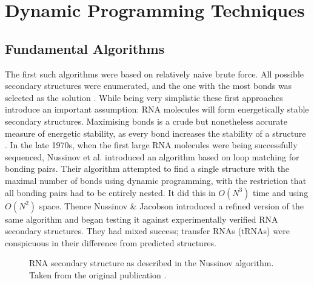 \documentclass{cshonours}
\begin{document}
\section{Dynamic Programming Techniques}
\subsection{Fundamental Algorithms}
The first such algorithms were based on relatively naive brute force. All possible secondary structures were enumerated, and the one with
the most bonds was selected as the solution \cite{nussinov1978algorithms}. While being very simplistic
these first approaches introduce an important assumption: RNA molecules will
form energetically stable secondary structures. Maximising bonds is a crude but
nonetheless accurate measure of energetic stability, as every bond increases the
stability of a structure \cite{nussinov1978algorithms}. In the late 1970s, when the first large RNA molecules
were being successfully sequenced, Nussinov et al. \cite{nussinov1978algorithms} introduced an algorithm
based on loop matching for bonding pairs. Their algorithm attempted to find a
single structure with the maximal number of bonds using dynamic programming,
with the restriction that all bonding pairs had to be entirely nested. It did this in $O(N^3)$ time and using $O(N^2)$ space. Thence Nussinov \& Jacobson \cite{nussinov1980fast} introduced
a refined version of the same algorithm and began testing it against experimentally verified RNA secondary structures. They had mixed success; transfer RNAs
(tRNAs) were conspicuous in their difference from predicted structures.

\begin{figure}
\begin{center}
\end{center}
\caption{RNA secondary structure as described in the Nussinov algorithm.
Taken from the original publication \cite{nussinov1980fast}.}
\label{nuss_rna}
\end{figure}
\end{document}
